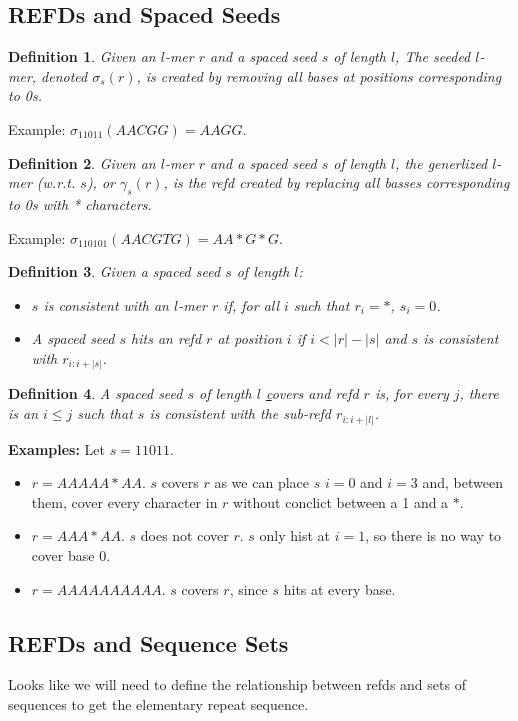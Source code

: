 \documentclass{article}
\newtheorem{definition}{Definition}
\begin{document}
\subsection{REFDs and Spaced Seeds}


\begin{definition}
Given an $l$-mer $r$ and a spaced seed $s$ of length $l$, The seeded
$l$-mer, denoted $\sigma_s(r)$, is created by removing all bases at
positions corresponding to 0s.
\end{definition}
Example: $\sigma_{11011}(AACGG) = AAGG$. 

\begin{definition}
Given an $l$-mer $r$ and a spaced seed $s$ of length $l$, the
generlized $l$-mer (w.r.t. $s$), or $\gamma_s(r)$, is the refd created by replacing
all basses corresponding to 0s with * characters.
\end{definition}
Example: $\sigma_{110101}(AACGTG) = AA*G*G$.

\begin{definition}
Given a spaced seed $s$ of length $l$: 
\begin{itemize}
\item $s$ is {\it consistent} with an $l$-mer $r$ if, for all
$i$ such that $r_i = *$, $s_i = 0$.  
\item A spaced seed $s$ hits an refd $r$ at position $i$ if 
  $i <|r|-|s|$ and $s$ is consistent with $r_{i:i+|s|}$.
\end{itemize}
\end{definition}

\begin{definition} 
A spaced seed $s$ of length $l$ {\underline covers} and refd $r$ is, for every $j$,
there is an $i \leq j$ such that $s$ is consistent with the sub-refd
$r_{i:i+|l|}$.
\end{definition}
{\bf Examples:} Let $s = 11011$.
\begin{itemize}
\item $r = AAAAA*AA$. $s$ covers $r$ as we can place $s$ $i=0$ and
  $i=3$ and, between them, cover every character in $r$ without
  conclict between a 1 and a $*$.
\item $r = AAA*AA$.  $s$ does not cover $r$.  $s$ only hist at $i=1$,
  so there is no way to cover base 0.
\item $r = AAAAAAAAAA$.  $s$ covers $r$, since $s$ hits at every base.
\end{itemize}

\subsection{REFDs and Sequence Sets}
Looks like we will need to define the relationship between refds and
sets of sequences to get the elementary repeat sequence.
\end{document}
